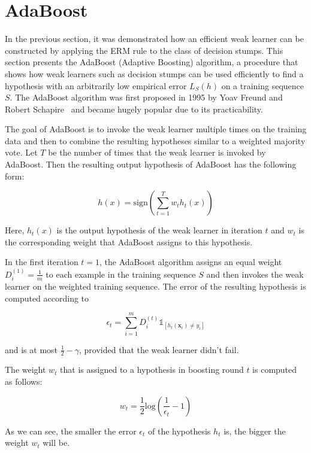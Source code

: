 \section{AdaBoost}
\label{sec:adaboost}

In the previous section, it was demonstrated how an efficient weak learner can be constructed by applying the ERM rule to
the class of decision stumps.
This section presents the AdaBoost (Adaptive Boosting) algorithm, a procedure that shows 
how weak learners such as decision stumps can be
used efficiently to find a hypothesis with an arbitrarily low empirical error $L_S(h)$ on a training sequence $S$.
The AdaBoost algorithm was first proposed in 1995 by Yoav Freund and Robert Schapire~\cite{FREUND1997119}
and became hugely popular due to its practicability.

The goal of AdaBoost is to invoke the weak learner multiple times on the training data and then to combine
the resulting hypotheses similar to a weighted majority vote.
Let $T$ be the number of times that the weak learner is invoked by AdaBoost. Then the resulting
output hypothesis of AdaBoost has the following form:
\begin{linenomath*}
    $$
    h(x) = \text{sign}\left( \sum_{t=1}^T w_t h_t(x) \right)
    $$
\end{linenomath*}
Here, $h_t(x)$ is the output hypothesis of the weak learner in iteration $t$ and $w_t$ is the corresponding weight
that AdaBoost assigns to this hypothesis.

In the first iteration $t=1$, the AdaBoost algorithm assigns an equal weight $D_i^{(1)} = \frac{1}{m}$ to each example
in the training sequence $S$ and then invokes the weak learner on the weighted training sequence.
The error of the resulting hypothesis is computed according to
\begin{linenomath*}
    $$
    \epsilon_t = \sum_{i=1}^m D_i^{(t)} \mathds{1}_{\left[ h_t(\mathbf{x}_i) \neq y_i \right]}
    $$
\end{linenomath*}
and is at most $\frac{1}{2}-\gamma$, provided that the weak learner didn't fail.

The weight $w_t$ that is assigned to a hypothesis in boosting round $t$ is computed as follows:
\begin{linenomath*}
    $$
    w_t = \frac{1}{2} \text{log} \left( \frac{1}{\epsilon_t} - 1 \right)
    $$
\end{linenomath*}
As we can see, the smaller the error $\epsilon_t$ of the hypothesis $h_t$ is, the bigger the weight $w_t$ will be.

